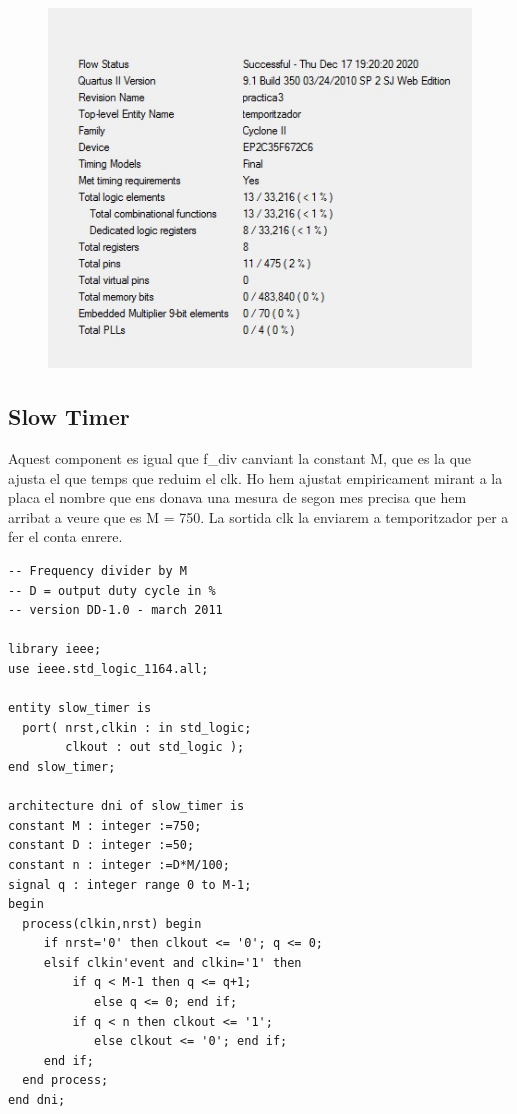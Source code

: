 \documentclass[12pt, a4papre]{article}
\begin{document}
	
			\begin{figure}[H]
			
				\begin{center}
		\includegraphics[width=130mm]{informeTemporitzador.jpeg}
		\end{center}
	\end{figure}
	
	
\subsection{Slow Timer}

Aquest component es igual que f\_div canviant la constant M, que es la que ajusta el que temps que reduim el clk. Ho hem ajustat empiricament mirant a la placa el nombre que ens donava una mesura de segon mes precisa que hem arribat a veure que es M = 750. La sortida clk la enviarem a temporitzador per a fer el conta enrere.

\begin{lstlisting}[style=vhdl, frame=single, basicstyle=\tiny]
	-- Frequency divider by M
-- D = output duty cycle in %
-- version DD-1.0 - march 2011

library ieee;
use ieee.std_logic_1164.all;

entity slow_timer is 
  port( nrst,clkin : in std_logic; 
        clkout : out std_logic );
end slow_timer;

architecture dni of slow_timer is
constant M : integer :=750;
constant D : integer :=50;
constant n : integer :=D*M/100;
signal q : integer range 0 to M-1;
begin
  process(clkin,nrst) begin
     if nrst='0' then clkout <= '0'; q <= 0;
     elsif clkin'event and clkin='1' then 
         if q < M-1 then q <= q+1; 
            else q <= 0; end if;
         if q < n then clkout <= '1';
            else clkout <= '0'; end if;
     end if;
  end process;
end dni;
	\end{lstlisting}
	
\end{document}
